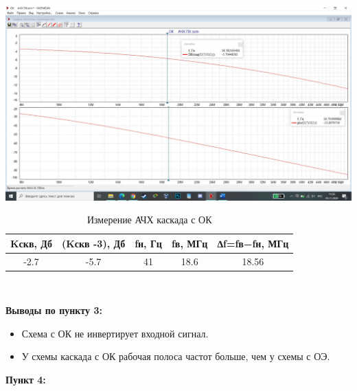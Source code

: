 \documentclass[a4paper,14pt]{extarticle}
\begin{document}
    \begin{center}
        \includegraphics[scale=0.25]{3.3.jpg}
    \end{center}

    \begin{table}[ht]
        \begin{center}
            \caption{Измерение АЧХ каскада с ОК}
            \begin{tabular}{ |c|c|c|c|c| }
                \hline
                Kскв, Дб & (Kскв -3), Дб&fн, Гц & fв, МГц & ∆f=fв−fн, МГц \\
                \hline 
                -2.7 & -5.7 & 41 & 18.6 & 18.56\\
                \hline
            \end{tabular}\\
        \end{center}
    \end{table}
    \textbf{Выводы по пункту 3:}
    \vspace{-6ex}
    \begin{singlespace}
        \begin{itemize}
            \item Схема с ОК не инвертирует входной сигнал.
            \item У схемы каскада с ОК рабочая полоса частот больше, чем у схемы с ОЭ.
        \end{itemize}
    \end{singlespace}


    \newpage
    \textbf{Пункт 4:}
\end{document}
